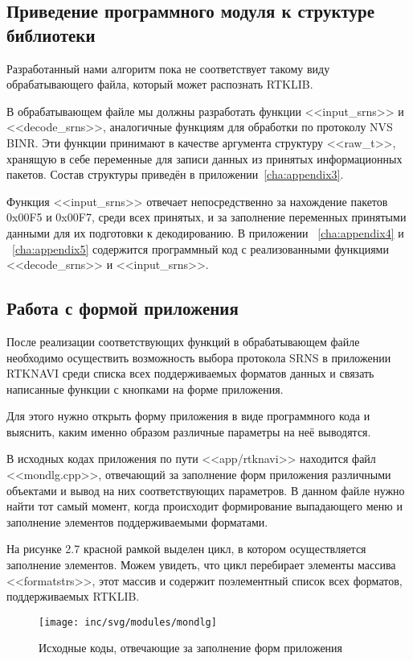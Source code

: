 \subsection{Приведение программного модуля к структуре библиотеки}
Разработанный нами алгоритм пока не соответствует такому виду обрабатывающего файла, который может распознать RTKLIB.

В обрабатывающем файле мы должны разработать функции <<input\_srns>> и <<decode\_srns>>, аналогичные функциям для обработки по протоколу NVS BINR. Эти функции принимают в качестве аргумента структуру <<raw\_t>>, хранящую в себе переменные для записи данных из принятых информационных пакетов. Состав структуры приведён в приложении~\ref{cha:appendix3}.

Функция <<input\_srns>> отвечает непосредственно за нахождение пакетов 0x00F5 и 0x00F7, среди всех принятых, и за заполнение переменных принятыми данными для их подготовки к декодированию. В приложении ~\ref{cha:appendix4} и ~\ref{cha:appendix5} содержится программный код с реализованными функциями <<decode\_srns>> и <<input\_srns>>.

\subsection{Работа с формой приложения}

После реализации соответствующих функций в обрабатывающем файле необходимо осуществить возможность выбора протокола SRNS в приложении RTKNAVI среди списка всех поддерживаемых форматов данных и связать написанные функции с кнопками на форме приложения.

Для этого нужно открыть форму приложения в виде программного кода и выяснить, каким именно образом различные параметры на неё выводятся. 

В исходных кодах приложения по пути <<app/rtknavi>> находится файл <<mondlg.cpp>>, отвечающий за заполнение форм приложения различными объектами и вывод на них соответствующих параметров. В данном файле нужно найти тот самый момент, когда происходит формирование выпадающего меню и заполнение элементов поддерживаемыми форматами. 

На рисунке 2.7 красной рамкой выделен цикл, в котором осуществляется заполнение элементов. Можем увидеть, что цикл перебирает элементы массива <<formatstrs>>, этот массив и содержит поэлементный список всех форматов, поддерживаемых RTKLIB. 
\begin{figure}[ht]
	\centering
	\texttt{[image: inc/svg/modules/mondlg]}
	\caption{Исходные коды, отвечающие за заполнение форм приложения}
	\label{fig:mondlg}
\end{figure}

